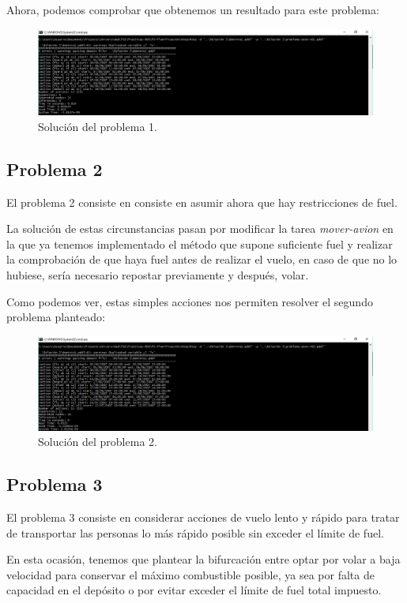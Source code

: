 \documentclass[a4paper, 11pt]{article}
\begin{document}
		Ahora, podemos comprobar que obtenemos un resultado para este problema:
		\begin{figure}[H]
			\centering
			\includegraphics[width=15cm]{Ej1-problema1.png}
			\caption{Solución del problema 1.}
			\label{Prob-1}
		\end{figure}
		
	\subsection{Problema 2}
		El problema 2 consiste en consiste en asumir ahora que hay restricciones de fuel.
		
		La solución de estas circunstancias pasan por modificar la tarea \textit{mover-avion} en la que ya tenemos
		implementado el método que supone suficiente fuel y realizar la comprobación de que haya fuel antes de
		realizar el vuelo, en caso de que no lo hubiese, sería necesario repostar previamente y después, volar.
		
		Como podemos ver, estas simples acciones nos permiten resolver el segundo problema planteado:
		\begin{figure}[H]
			\centering
			\includegraphics[width=15cm]{Ej1-problema2.png}
			\caption{Solución del problema 2.}
			\label{Prob-2}
		\end{figure}
		
	\subsection{Problema 3}
		El problema 3 consiste en considerar acciones de vuelo lento y rápido para tratar de transportar las
		personas lo más rápido posible sin exceder el límite de fuel.
		
		En esta ocasión, tenemos que plantear la bifurcación entre optar por volar a baja velocidad para
		conservar el máximo combustible posible, ya sea por falta de capacidad en el depósito o por evitar
		exceder el límite de fuel total impuesto.
		
\end{document}
